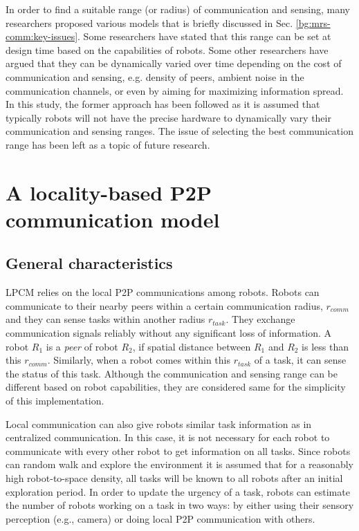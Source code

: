 In order to find a suitable  range (or radius) of communication and sensing,  many researchers proposed various models that is briefly discussed in Sec. \ref{bg:mrs-comm:key-issues}. Some researchers have stated that this range can be set at design time based on the capabilities of robots. Some other researchers have argued that they can be dynamically varied over time depending on the  cost of communication and sensing, e.g. density of peers, ambient noise in the communication channels, or even by aiming for maximizing information spread. In this study,  the former approach has been followed as it is assumed that typically robots will not have the precise hardware to dynamically vary their communication and sensing ranges. The issue of selecting the best communication range  has been left as a topic of future research.
\section{A locality-based P2P communication model}
\label{local-comm:model}
\subsection{General characteristics}
LPCM relies on the local P2P communications among robots. Robots can communicate to their nearby peers within a certain communication radius, $r_{comm}$ and they can sense tasks within another radius $r_{task}$. They exchange communication signals reliably without any significant loss of information. A robot $R_1$ is a {\em peer} of robot $R_2$, if spatial distance between $R_1$ and $R_2$ is less than this $r_{comm}$.
Similarly, when a robot comes within this $r_{task}$ of a task, it can sense the status of this task. Although the communication and sensing  range can be different based on robot capabilities,   they are considered same for the simplicity of this implementation.

Local communication can also give robots similar task information as in centralized communication. In this case, it is not necessary for each robot to communicate with every other robot to get information on all tasks. Since robots can random walk and explore the environment it is assumed that for a reasonably high robot-to-space density, all tasks will be known to all robots after an initial exploration period. In order to update the urgency of a task, robots can estimate the number of robots working on a task in two ways:  by either using their sensory perception (e.g., camera) or  doing local P2P communication with others.

